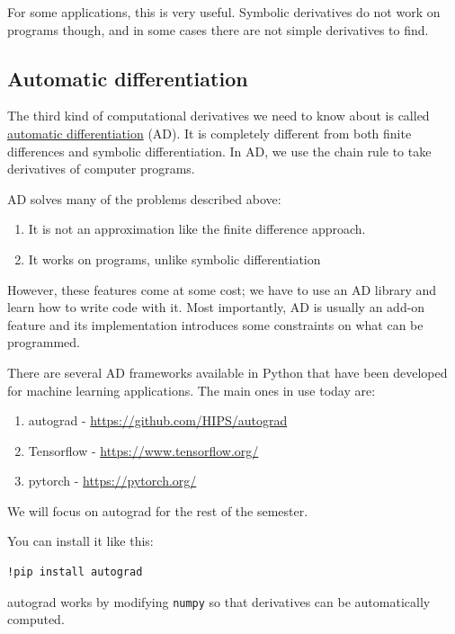 \documentclass[11pt]{article}
\begin{document}
For some applications, this is very useful. Symbolic derivatives do not work on programs though, and in some cases there are not simple derivatives to find.

\subsection{Automatic differentiation}
\label{sec:org3956147}

The third kind of computational derivatives we need to know about is called \href{https://en.wikipedia.org/wiki/Automatic\_differentiation}{automatic differentiation} (AD). It is completely different from both finite differences and symbolic differentiation. In AD, we use the chain rule to take derivatives of computer programs.

AD solves many of the problems described above:
\begin{enumerate}
\item It is not an approximation like the finite difference approach.
\item It works on programs, unlike symbolic differentiation
\end{enumerate}

However, these features come at some cost; we have to use an AD library and learn how to write code with it. Most importantly, AD is usually an add-on feature and its implementation introduces some constraints on what can be programmed.

There are several AD frameworks available in Python that have been developed for machine learning applications. The main ones in use today are:

\begin{enumerate}
\item autograd - \url{https://github.com/HIPS/autograd}
\item Tensorflow - \url{https://www.tensorflow.org/}
\item pytorch - \url{https://pytorch.org/}
\end{enumerate}

We will focus on autograd for the rest of the semester.

You can install it like this:

\begin{verbatim}
!pip install autograd
\end{verbatim}

autograd works by modifying \texttt{numpy} so that derivatives can be automatically computed.
\end{document}
